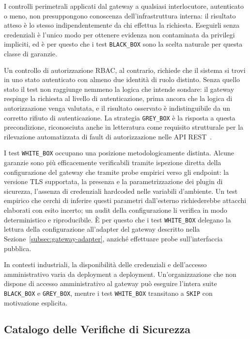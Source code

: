

I controlli perimetrali applicati dal gateway a qualsiasi interlocutore, autenticato o meno, non presuppongono conoscenza dell'infrastruttura interna: il risultato atteso è lo stesso indipendentemente da chi effettua la richiesta. Eseguirli senza credenziali è l'unico modo per ottenere evidenza non contaminata da privilegi impliciti, ed è per questo che i test \texttt{BLACK\_BOX} sono la scelta naturale per questa classe di garanzie.

Un controllo di autorizzazione \gls{RBAC}, al contrario, richiede che il sistema si trovi in uno stato autenticato con almeno due identità di ruolo distinto. Senza quello stato il test non raggiunge nemmeno la logica che intende sondare: il gateway respinge la richiesta al livello di autenticazione, prima ancora che la logica di autorizzazione venga valutata, e il risultato osservato è indistinguibile da un corretto rifiuto di autenticazione. La strategia \texttt{GREY\_BOX} è la risposta a questa precondizione, riconosciuta anche in letteratura come requisito strutturale per la rilevazione automatizzata di fault di autorizzazione nelle \gls{API} REST~\cite{sahinEnhancingRESTAPI2026}.

I test \texttt{WHITE\_BOX} occupano una posizione metodologicamente distinta. Alcune garanzie sono più efficacemente verificabili tramite ispezione diretta della configurazione del gateway che tramite probe empirici verso gli endpoint: la versione \gls{TLS} supportata, la presenza e la parametrizzazione dei plugin di sicurezza, l'assenza di credenziali hardcoded nelle variabili d'ambiente. Un test empirico che cerchi di inferire questi parametri dall'esterno richiederebbe attacchi elaborati con esito incerto; un audit della configurazione li verifica in modo deterministico e riproducibile. È per questo che i test \texttt{WHITE\_BOX} delegano la lettura della configurazione all'adapter del gateway descritto nella Sezione~\ref{subsec:gateway-adapter}, anziché effettuare probe sull'interfaccia pubblica.


In contesti industriali, la disponibilità delle credenziali e dell'accesso amministrativo varia da deployment a deployment. Un'organizzazione che non dispone di accesso amministrativo al gateway può eseguire l'intera suite \texttt{BLACK\_BOX} e \texttt{GREY\_BOX}, mentre i test \texttt{WHITE\_BOX} transitano a \texttt{SKIP} con motivazione esplicita.

\subsection{Catalogo delle Verifiche di Sicurezza}\label{subsec:test-catalog}

